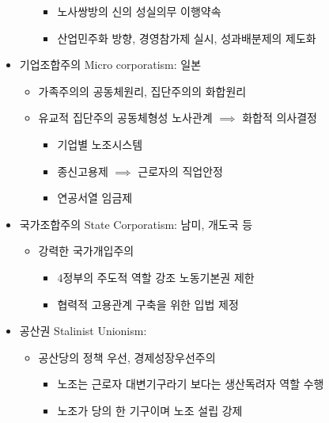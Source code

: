 \documentclass[aspectratio=169,xcolor=dvipsnames,handout]{beamer}
\begin{document}
\begin{frame}[allowframebreaks]
\begin{itemize}[<+->]
\begin{itemize}
\begin{itemize}
               \item 노사쌍방의 신의 성실의무 이행약속
               \item 산업민주화 방향, 경영참가제 실시, 성과배분제의 제도화
\end{itemize}
        \end{itemize}
        \item 기업조합주의 Micro corporatism: 일본
        \begin{itemize}
        \item 가족주의의 공동체원리, 집단주의의 화합원리
            \item 유교적 집단주의 공동체형성 노사관계 $\implies$ 화합적 의사결정
\begin{itemize}
               \item 기업별 노조시스템
               \item 종신고용제 $\implies$ 근로자의 직업안정
               \item 연공서열 임금제
\end{itemize}
        \end{itemize}
        \item 국가조합주의 State Corporatism: 남미, 개도국 등
        \begin{itemize}
            \item 강력한 국가개입주의
\begin{itemize}
               \item 4정부의 주도적 역할 강조 노동기본권 제한
               \item 협력적 고용관계 구축을 위한 입법 제정
\end{itemize}
        \end{itemize}
        \item 공산권 Stalinist Unionism:
        \begin{itemize}
            \item 공산당의 정책 우선, 경제성장우선주의
\begin{itemize}
               \item 노조는 근로자 대변기구라기 보다는 생산독려자 역할 수행
               \item 노조가 당의 한 기구이며 노조 설립 강제
\end{itemize}
        \end{itemize}
    \end{itemize}
\end{frame}
\end{document}
